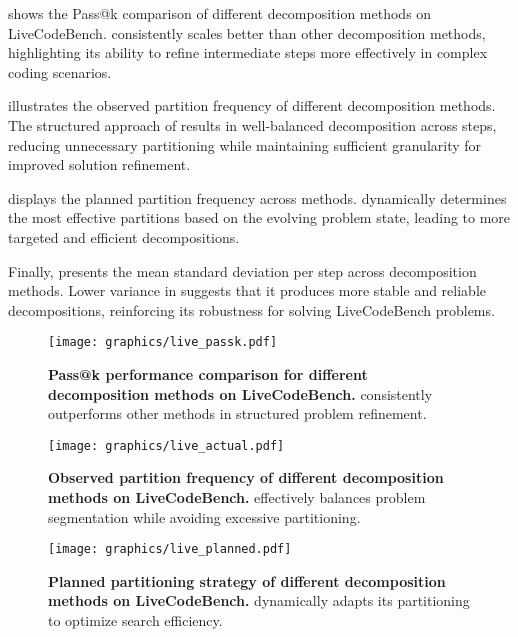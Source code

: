  shows the Pass@k comparison of different decomposition methods on LiveCodeBench. \decomp consistently scales better than other decomposition methods, highlighting its ability to refine intermediate steps more effectively in complex coding scenarios.

 illustrates the observed partition frequency of different decomposition methods. The structured approach of \decomp results in well-balanced decomposition across steps, reducing unnecessary partitioning while maintaining sufficient granularity for improved solution refinement.

 displays the planned partition frequency across methods. \decomp dynamically determines the most effective partitions based on the evolving problem state, leading to more targeted and efficient decompositions.

Finally,  presents the mean standard deviation per step across decomposition methods. Lower variance in \decomp suggests that it produces more stable and reliable decompositions, reinforcing its robustness for solving LiveCodeBench problems.

\begin{figure}
    \centering
    \texttt{[image: graphics/live\_passk.pdf]}
    \caption{\textbf{Pass@k performance comparison for different decomposition methods on LiveCodeBench.} \decomp consistently outperforms other methods in structured problem refinement.}
    \label{fig:live_passk}
\end{figure}

\begin{figure}[ht]
    \centering
    \texttt{[image: graphics/live\_actual.pdf]}
    \caption{\textbf{Observed partition frequency of different decomposition methods on LiveCodeBench.} \decomp effectively balances problem segmentation while avoiding excessive partitioning.}
    \label{fig:live_actualpart}
\end{figure}

\begin{figure}[ht]
    \centering
    \texttt{[image: graphics/live\_planned.pdf]}
    \caption{\textbf{Planned partitioning strategy of different decomposition methods on LiveCodeBench.} \decomp dynamically adapts its partitioning to optimize search efficiency.}
    \label{fig:live_plannedpart}
\end{figure}

